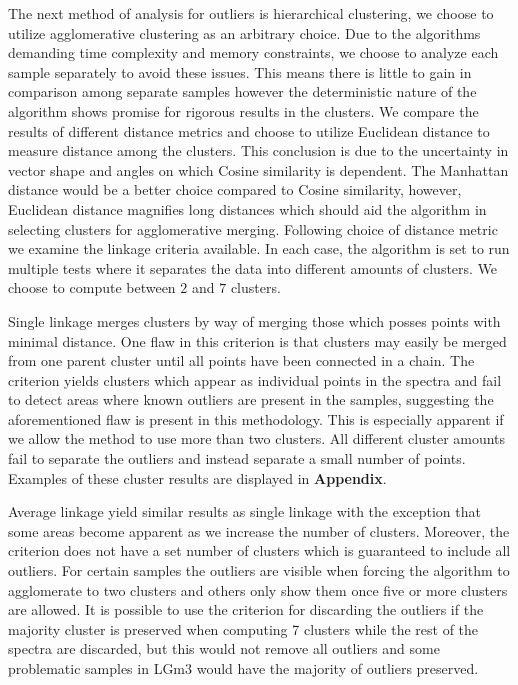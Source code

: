 The next method of analysis for outliers is hierarchical clustering, we choose to utilize agglomerative clustering as an arbitrary choice. Due to the algorithms demanding time complexity and memory constraints, we choose to analyze each sample separately to avoid these issues. This means there is little to gain in comparison among separate samples however the deterministic nature of the algorithm shows promise for rigorous results in the clusters. We compare the results of different distance metrics and choose to utilize Euclidean distance to measure distance among the clusters. This conclusion is due to the uncertainty in vector shape and angles on which Cosine similarity is dependent. The Manhattan distance would be a better choice compared to Cosine similarity, however, Euclidean distance magnifies long distances which should aid the algorithm in selecting clusters for agglomerative merging. Following choice of distance metric we examine the linkage criteria available. In each case, the algorithm is set to run multiple tests where it separates the data into different amounts of clusters. We choose to compute between $2$ and $7$ clusters.

Single linkage merges clusters by way of merging those which posses points with minimal distance. One flaw in this criterion is that clusters may easily be merged from one parent cluster until all points have been connected in a chain. The criterion yields clusters which appear as individual points in the spectra and fail to detect areas where known outliers are present in the samples, suggesting the aforementioned flaw is present in this methodology. This is especially apparent if we allow the method to use more than two clusters. All different cluster amounts fail to separate the outliers and instead separate a small number of points. Examples of these cluster results are displayed in \textbf{Appendix}.

Average linkage yield similar results as single linkage with the exception that some areas become apparent as we increase the number of clusters. Moreover, the criterion does not have a set number of clusters which is guaranteed to include all outliers. For certain samples the outliers are visible when forcing the algorithm to agglomerate to two clusters and others only show them once five or more clusters are allowed. It is possible to use the criterion for discarding the outliers if the majority cluster is preserved when computing 7 clusters while the rest of the spectra are discarded, but this would not remove all outliers and some problematic samples in LGm3 would have the majority of outliers preserved. 

